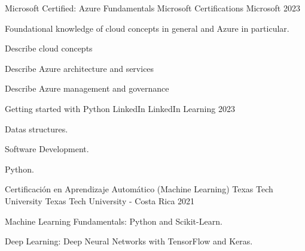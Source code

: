 

\begin{cventries}


  \cventry
  {Microsoft Certified: Azure Fundamentals} %
    {Microsoft Certifications} %
    {Microsoft} %
    {2023} %
    {
      \begin{cvitems} %
        \item Foundational knowledge of cloud concepts in general and Azure in
              particular.
        \item Describe cloud concepts
        \item Describe Azure architecture and services
        \item Describe Azure management and governance
      \end{cvitems}
    }
  \cventry
  {Getting started with Python} %
    {LinkedIn} %
    {LinkedIn Learning} %
    {2023} %
    {
      \begin{cvitems} %
        \item Datas structures.
        \item Software Development.
        \item Python.
      \end{cvitems}
    }
  \cventry
    {Certificación en Aprendizaje Automático (Machine Learning)} %
    {Texas Tech University} %
    {Texas Tech University - Costa Rica} %
    {2021} %
    {
      \begin{cvitems} %
        \item Machine Learning Fundamentals: Python and Scikit-Learn.
        \item Deep Learning: Deep Neural Networks with TensorFlow and Keras.

\end{cvitems}}
\end{cventries}

